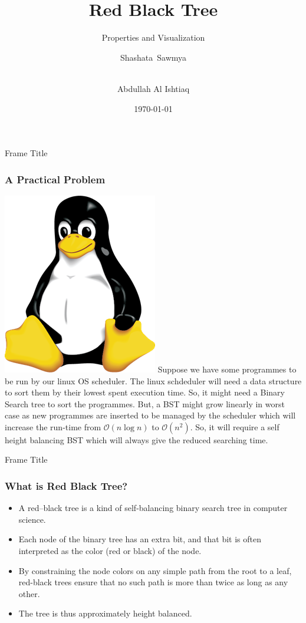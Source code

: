 \documentclass{beamer}
\title{Red Black Tree}
\subtitle{Properties and Visualization}
\author[Sawmya, Niloy] %
{Shashata~Sawmya\inst{1} \and \\Abdullah Al Ishtiaq\inst{1}}
\institute[BUET] %
{
  \inst{1}%
  Department of Computer Science and Engineering\\
  BUET
  
}
\date{\today}
\begin{document}
\maketitle

\begin{frame}{Frame Title}
\frametitle{A Practical Problem}
\centering
\includegraphics[scale = 0.4]{Pictures/Linux_Logo.png}
Suppose we have some programmes to be run by our linux OS scheduler. The linux schdeduler will need a data structure to sort them by their lowest spent execution time. So, it might need a Binary Search tree to sort the programmes. But, a BST might grow linearly in worst case as new programmes are inserted  to be managed by the scheduler which will increase the run-time from $\mathcal{O}(n\log{n})$ to $\mathcal{O}(n^2)$. So, it will require a self height balancing BST which will always give the reduced searching time. 


    
\end{frame}

\begin{frame}{Frame Title}
\frametitle{What is Red Black Tree?}
    \begin{itemize}
        \item<1-> A red–black tree is a kind of self-balancing binary search tree in computer science. 
        \item<2-> Each node of the binary tree has an extra bit, and that bit is often interpreted as the color (red or black) of the node. 
        \item<3-> By constraining the node colors on any simple path from the root to a leaf, red-black trees ensure that no such path is more than twice as long as any other. 
        \item<4->  The tree is thus approximately height balanced. 
    \end{itemize}
      
\end{frame}
\end{document}
